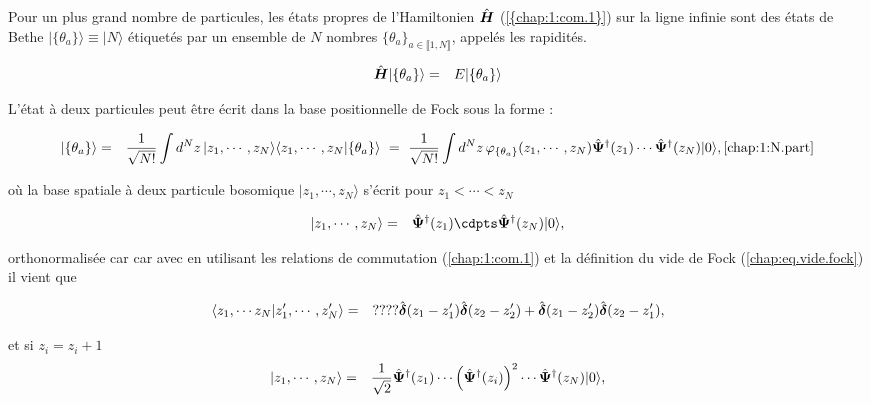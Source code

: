 Pour un plus grand nombre de particules, les états propres de l'Hamiltonien \(\hat{\bm{H}}\) (\ref{{chap:1:com.1}}) sur la ligne infinie sont des états de Bethe $\vert \{\theta_a\}\rangle \equiv \vert N \rangle $ étiquetés par un ensemble de $N$ nombres $\{\theta_a\}_{a \in \llbracket 1 , N \rrbracket } $, appelés les rapidités. %

\begin{eqnarray}
	\hat{\bm{H}} \vert \{\theta_a\}\rangle & = & E \vert \{\theta_a\}\rangle 		
\end{eqnarray}

L’état à deux particules peut être écrit dans la base positionnelle de Fock sous la forme :

\begin{eqnarray}
	\vert \{\theta_a\} \rangle & = & \frac{1}{\sqrt{N!}}\int d^Nz \, \vert z_1 , \cdots , z_N \rangle \langle z_1 , \cdots , z_N  \vert \{\theta_a\}  \rangle ~=~\frac{1}{\sqrt{N!}} \int d^Nz \, \varphi_{\{\theta_a\}}(z_1, \cdots ,  z_N) \hat{\bm{\Psi}}^\dag(z_1) \cdots  \hat{\bm{\Psi}}^\dag(z_N) \vert 0 \rangle, \ref{chap:1:N.part}
\end{eqnarray}

où la base spatiale à deux particule bosomique $\vert z_1 , \cdots ,  z_N \rangle$ s'écrit pour $z_1 < \cdots <  z_N$

\begin{eqnarray}
	\vert z_1 , \cdots ,  z_N  \rangle  & = &  \operator{\Psi}^\dag(z_1) \cdpts \operator{\Psi}^\dag(z_N) \vert 0 \rangle ,
\end{eqnarray}

orthonormalisée car car avec en utilisant les relations de commutation (\ref{chap:1:com.1})  et la définition du vide de Fock (\ref{chap:eq.vide.fock}) il vient que 

\begin{eqnarray}
	\langle z_1 , \cdots z_N \vert z_1' ,  \cdots , z_N' \rangle  & = & ???? \hat{\bm{\delta}}(z_1 -z_1')\hat{\bm{\delta}}(z_2 -z_2')  +   \hat{\bm{\delta}}(z_1 -z_2')\hat{\bm{\delta}}(z_2 -z_1'),
\end{eqnarray}

et si $z_i =  z_i+1 $
\begin{eqnarray}
	\vert z_1 , \cdots ,  z_N  \rangle  & = &  \frac{1}{\sqrt{2}} \hat{\bm{\Psi}}^\dag(z_1) \cdots \left(\hat{\bm{\Psi}}^\dag(z_i)\right)^2 \cdots \hat{\bm{\Psi}}^\dag(z_N) \vert 0 \rangle ,
\end{eqnarray}

